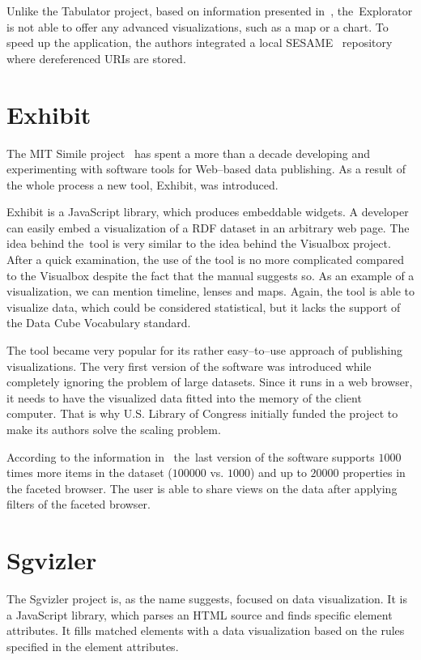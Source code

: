Unlike the Tabulator project, based on information presented in~\cite{explorator},
the~Explorator is not able to offer any advanced visualizations, such as a map or 
a chart. To speed up the application, the authors integrated a local SESAME~\cite{sesame} 
repository where dereferenced URIs are stored.

\section{Exhibit}
The MIT Simile project~\cite{mit-simile} has spent a more than a decade
developing and experimenting with software tools for Web--based data publishing.
As a result of the whole process a new tool, Exhibit, was introduced.

Exhibit is a JavaScript library, which produces embeddable widgets. A developer can
easily embed a visualization of a RDF dataset in an arbitrary web page. The idea behind 
the~tool is very similar to the idea behind the Visualbox project. After a quick 
examination, the use of the tool is no more complicated compared to the 
Visualbox despite the fact that the manual suggests so. As an example of a 
visualization, we can mention timeline, lenses and maps. Again, the tool is able 
to visualize data, which could be considered statistical, but it lacks the 
support of the Data Cube Vocabulary standard.

The tool became very popular for its rather easy--to--use 
approach of publishing visualizations. The very first version of the software
was introduced while completely ignoring the problem of large datasets.
Since it runs in a web browser, it needs to have the visualized data
fitted into the memory of the client 
computer. That is why U.S. Library of Congress initially funded the project to 
make its authors solve the scaling problem.

According to the information in~\cite{exhibit}
the~last version of the software supports $1000$ times more items in the
dataset ($100 000$ vs. $1000$) and up to $20 000$ properties in the faceted browser. 
The user is able to share views on the data after applying filters of the 
faceted browser. 

\section{Sgvizler}
The Sgvizler project is, as the name suggests, focused on data visualization. 
It is a JavaScript library, which parses an HTML source and finds specific 
element attributes. It fills matched elements with a data visualization based on 
the rules specified in the element attributes.

